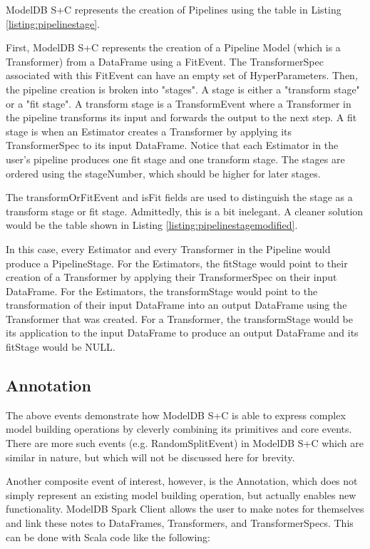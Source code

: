 ModelDB S+C represents the creation of Pipelines using the table in Listing \ref{listing:pipelinestage}.

First, ModelDB S+C represents the creation of a Pipeline Model (which is a Transformer) from
a DataFrame using a FitEvent. The TransformerSpec associated with this FitEvent can have an empty
set of HyperParameters. Then, the pipeline creation is broken into "stages". A stage is either a 
"transform stage" or a "fit stage". A transform stage is a TransformEvent where a Transformer in the pipeline
transforms its input and forwards the output to the next step. A fit stage is when an Estimator creates a Transformer
by applying its TransformerSpec to its input DataFrame. Notice that each Estimator in the user's pipeline produces
one fit stage and one transform stage. The stages are ordered using the stageNumber, which should be higher for later
stages.

The transformOrFitEvent and isFit fields are used to distinguish the stage as a transform stage or fit stage. Admittedly,
this is a bit inelegant. A cleaner solution would be the table shown in Listing \ref{listing:pipelinestagemodified}.

In this case, every Estimator and every Transformer in the Pipeline would produce a PipelineStage. For the Estimators,
the fitStage would point to their creation of a Transformer by applying their TransformerSpec on their input DataFrame.
For the Estimators, the transformStage would point to the transformation of their input DataFrame into an output DataFrame 
using the Transformer that was created. For a Transformer, the transformStage would be its application to the input DataFrame
to produce an output DataFrame and its fitStage would be NULL.

\subsection{Annotation}
The above events demonstrate how ModelDB S+C is able to express complex model building operations by
cleverly combining its primitives and core events. There are more such events (e.g. RandomSplitEvent) in
ModelDB S+C which are similar in nature, but which will not be discussed here for brevity.

Another composite event of interest, however, is the Annotation, which does not simply represent
an existing model building operation, but actually enables new functionality. ModelDB Spark Client allows the user
to make notes for themselves and link these notes to DataFrames, Transformers, and TransformerSpecs. This can be done
with Scala code like the following:

